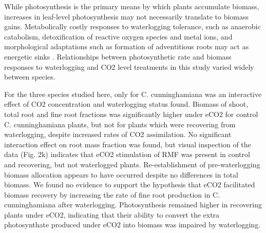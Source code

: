 \documentclass[12pt,a4paper]{memoir}
\begin{document}
While photosynthesis is the primary means by which plants accumulate biomass, increases in leaf-level photosynthesis may not necessarily translate to biomass gains. Metabolically costly responses to waterlogging tolerance, such as anaerobic catabolism, detoxification of reactive oxygen species and metal ions, and morphological adaptations such as formation of adventitious roots may act as energetic sinks \citep{Colmer2009}. Relationships between photosynthetic rate and biomass responses to waterlogging and CO2 level treatments in this study varied widely between species.

For the three species studied here, only for C. cunninghamiana was an interactive effect of CO2 concentration and waterlogging status found. Biomass of shoot, total root and fine root fractions was significantly higher under eCO2 for control C. cunninghamiana plants, but not for plants which were recovering from waterlogging, despite increased rates of CO2 assimilation. No significant interaction effect on root mass fraction was found, but visual inspection of the data (Fig. 2k) indicates that eCO2 stimulation of RMF was present in control and recovering, but not waterlogged plants. Re-establishment of pre-waterlogging biomass allocation appears to have occurred despite no differences in total biomass. We found no evidence to support the hypothesis that eCO2 facilitated biomass recovery by increasing the rate of fine root production in C. cunninghamiana after waterlogging. Photosynthesis remained higher in recovering plants under eCO2, indicating that their ability to convert the extra photosynthate produced under eCO2 into biomass was impaired by waterlogging. 
\end{document}

